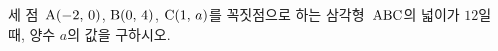 세 점~$\mathrm{A}(-2,\,0)$, $\mathrm{B}(0,\,4)$, $\mathrm{C}(1,\,a)$를 꼭짓점으로 하는 삼각형~$\mathrm{ABC}$의 넓이가 $12$일 때, 양수 $a$의 값을 구하시오.
